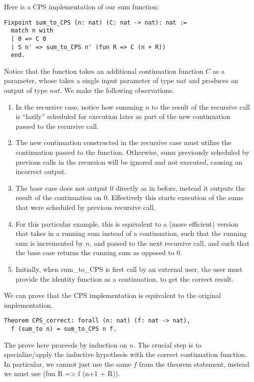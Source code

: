 \documentclass{article}
\begin{document}
Here is a CPS implementation of our sum function:
\begin{verbatim}
Fixpoint sum_to_CPS (n: nat) (C: nat -> nat): nat :=
  match n with
  | 0 => C 0
  | S n' => sum_to_CPS n' (fun R => C (n + R))
  end.
\end{verbatim}

Notice that the function takes an additional continuation function $C$ as a parameter, whose takes a single input parameter of type $nat$ and produces
an output of type $nat$. We make the following observations:
\begin{enumerate}
    \item In the recursive case, notice how summing $n$ to the result of the recursive call is ``lazily'' scheduled for execution later as 
          part of the new continuation passed to the recursive call.
    \item The new continuation constructed in the recursive case must utilize the continuation passed to the function. Otherwise, sums previously
          scheduled by previous calls in the recursion will be ignored and not executed, causing an incorrect output.
    \item The base case does not output $0$ directly as in before, instead it outputs the result of the continuation on $0$. Effectively this
          starts execution of the sums that were scheduled by previous recursive call.
    \item For this particular example, this is equivalent to a (more efficient) version that takes in a running sum instead of a continuation, such
          that the running sum is incremented by $n$, and passed to the next recursive call, and such that the base case returns the running sum
          as opposed to 0.
    \item Initially, when sum\_to\_CPS is first call by an external user, the user must provide the identity function as a continuation, to get the correct
          result.
\end{enumerate}

We can prove that the CPS implementation is equivalent to the original implementation.
\begin{verbatim}
Theorem CPS_correct: forall (n: nat) (f: nat -> nat),
  f (sum_to n) = sum_to_CPS n f.
\end{verbatim}

The prove here proceeds by induction on $n$. The crucial step is to specialize/apply the inductive hypothesis
with the correct continuation function. In particular, we cannot just use the same $f$ from the theorem statement,
instead we must use (fun R => f (n+1 + R)). \\
\end{document}
